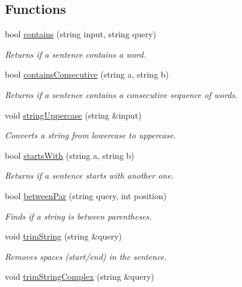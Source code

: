 \subsection*{Functions}
\begin{DoxyCompactItemize}
\item 
bool \hyperlink{namespaceutils_a69c832543a093a8099189e4755695a62}{contains} (string input, string query)
\begin{DoxyCompactList}\small\item\em Returns if a sentence contains a word. \end{DoxyCompactList}\item 
bool \hyperlink{namespaceutils_af9af9e01b679f955003203f29ddf130b}{contains\+Consecutive} (string a, string b)
\begin{DoxyCompactList}\small\item\em Returns if a sentence contains a consecutive sequence of words. \end{DoxyCompactList}\item 
void \hyperlink{namespaceutils_a4cc31521e740c9e31b4bfa8ee85eff46}{string\+Uppercase} (string \&input)
\begin{DoxyCompactList}\small\item\em Converts a string from lowercase to uppercase. \end{DoxyCompactList}\item 
bool \hyperlink{namespaceutils_ae840ea1b4ad4ce23c2b48158ac75d557}{starts\+With} (string a, string b)
\begin{DoxyCompactList}\small\item\em Returns if a sentence starts with another one. \end{DoxyCompactList}\item 
bool \hyperlink{namespaceutils_a1e1de2e5772bffdfe2c8d3309a61ddab}{between\+Par} (string query, int position)
\begin{DoxyCompactList}\small\item\em Finds if a string is between parentheses. \end{DoxyCompactList}\item 
void \hyperlink{namespaceutils_a9f184d101ac739ab058355ab5413ca9a}{trim\+String} (string \&query)
\begin{DoxyCompactList}\small\item\em Removes spaces (start/end) in the sentence. \end{DoxyCompactList}\item 
void \hyperlink{namespaceutils_a0362c7510f0bb0c4449031f897626696}{trim\+String\+Complex} (string \&query)

\end{DoxyCompactItemize}
